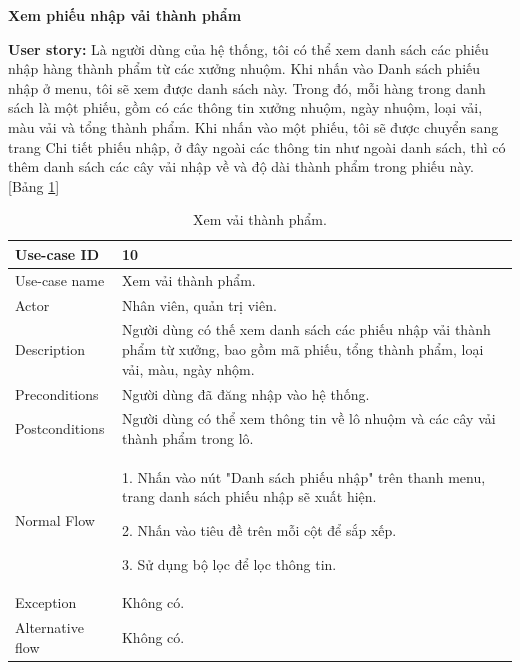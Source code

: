 \textbf{Xem phiếu nhập vải thành phẩm}\par
\textbf{User story:} Là người dùng của hệ thống, tôi có thể xem danh sách các phiếu nhập hàng thành phẩm từ các xưởng nhuộm. Khi nhấn vào Danh sách phiếu nhập ở menu, tôi sẽ xem được danh sách này. Trong đó, mỗi hàng trong danh sách là một phiếu, gồm có các thông tin xưởng nhuộm, ngày nhuộm, loại vải, màu vải và tổng thành phẩm. Khi nhấn vào một phiếu, tôi sẽ được chuyển sang trang Chi tiết phiếu nhập, ở đây ngoài các thông tin như ngoài danh sách, thì có thêm danh sách các cây vải nhập về và độ dài thành phẩm trong phiếu này. [Bảng \ref{bang10}]
\begin{table}[H]
    \centering
    \begin{tabular}{|m{3cm}|m{10cm}|}
    \hline 
        Use-case ID & 10\\ \hline
        Use-case name & Xem vải thành phẩm.\\ \hline
        Actor & Nhân viên, quản trị viên.\\ \hline
        Description & Người dùng có thế xem danh sách các phiếu nhập vải thành phẩm từ xưởng, bao gồm mã phiếu, tổng thành phẩm, loại vải, màu, ngày nhộm.\\ \hline
        Preconditions & Người dùng đã đăng nhập vào hệ thống.\\ \hline
        Postconditions & Người dùng có thể xem thông tin về lô nhuộm và các cây vải thành phẩm trong lô.\\ \hline
        Normal Flow & 
        1. Nhấn vào nút "Danh sách phiếu nhập" trên thanh menu, trang danh sách phiếu nhập sẽ xuất hiện.\par
        2. Nhấn vào tiêu đề trên mỗi cột để sắp xếp.\par
        3. Sử dụng bộ lọc để lọc thông tin.
        \\ \hline
        Exception & Không có.\\ \hline
        Alternative flow & Không có.\\ 
    \hline 
    \end{tabular}
    \caption{Xem vải thành phẩm.}
    \label{bang10}
\end{table}


